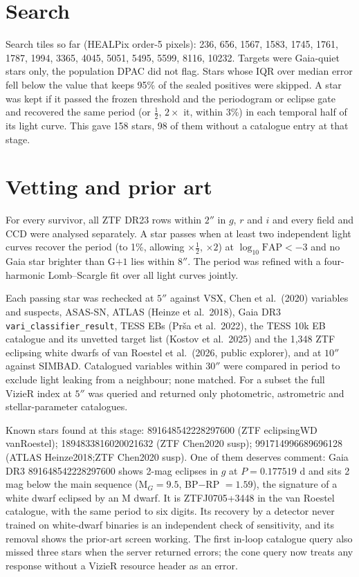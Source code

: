 \documentclass[11pt]{article}
\begin{document}
\section{Search}
Search tiles so far (HEALPix order-5 pixels): 236, 656, 1567, 1583, 1745, 1761, 1787, 1994, 3365, 4045, 5051, 5495, 5599, 8116, 10232. Targets were Gaia-quiet stars only, the population DPAC did not flag. Stars whose IQR over median error fell below the value that keeps 95\% of the sealed positives were skipped. A star was kept if it passed the frozen threshold and the periodogram or eclipse gate and recovered the same period (or $\tfrac12$, $2\times$ it, within 3\%) in each temporal half of its light curve. This gave 158 stars, 98 of them without a catalogue entry at that stage.

\section{Vetting and prior art}\label{sec:vet}
For every survivor, all ZTF DR23 rows within $2''$ in $g$, $r$ and $i$ and every field and CCD were analysed separately. A star passes when at least two independent light curves recover the period (to 1\%, allowing $\times\tfrac12$, $\times2$) at $\log_{10}\mathrm{FAP}<-3$ and no Gaia star brighter than G$+1$ lies within $8''$. The period was refined with a four-harmonic Lomb--Scargle fit over all light curves jointly.

Each passing star was rechecked at $5''$ against VSX, Chen et al.\ (2020) variables and suspects, ASAS-SN, ATLAS (Heinze et al.\ 2018), Gaia DR3 \texttt{vari\_classifier\_result}, TESS EBs (Prša et al.\ 2022), the TESS 10k EB catalogue and its unvetted target list (Kostov et al.\ 2025) and the 1{,}348 ZTF eclipsing white dwarfs of van Roestel et al.\ (2026, public explorer), and at $10''$ against SIMBAD. Catalogued variables within $30''$ were compared in period to exclude light leaking from a neighbour; none matched. For a subset the full VizieR index at $5''$ was queried and returned only photometric, astrometric and stellar-parameter catalogues.

Known stars found at this stage: 891648542228297600 (ZTF eclipsingWD vanRoestel); 1894833816020021632 (ZTF Chen2020 susp); 991714996689696128 (ATLAS Heinze2018;ZTF Chen2020 susp). One of them deserves comment: Gaia DR3 891648542228297600 shows 2-mag eclipses in $g$ at $P=0.177519$ d and sits 2 mag below the main sequence (M$_G=9.5$, BP$-$RP $=1.59$), the signature of a white dwarf eclipsed by an M dwarf. It is ZTFJ0705+3448 in the van Roestel catalogue, with the same period to six digits. Its recovery by a detector never trained on white-dwarf binaries is an independent check of sensitivity, and its removal shows the prior-art screen working. The first in-loop catalogue query also missed three stars when the server returned errors; the cone query now treats any response without a VizieR resource header as an error.
\end{document}
